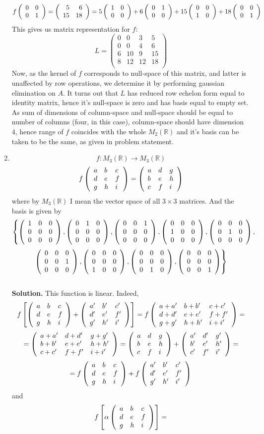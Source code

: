 \documentclass[12pt,fleqn]{article} %
\begin{document}
\begin{enumerate}
	\[f\left(\begin{array}{rr}0&0\\0&1\end{array}\right)=
\left(\begin{array}{rr}
5&6\\
15&18\\
\end{array}\right)=5\left(\begin{array}{rr}1&0\\0&0\end{array}\right)+6\left(\begin{array}{rr}0&1\\0&0\end{array}\right)+15\left(\begin{array}{rr}0&0\\1&0\end{array}\right)+18\left(\begin{array}{rr}0&0\\0&1\end{array}\right)\]
This gives us matrix representation for $f$:
\[L=\left(\begin{array}{rrrr}
	0&0&3&5\\
	0&0&4&6\\
	6&10&9&15\\
	8&12&12&18\\
\end{array}\right)\]
Now, as the kernel of $f$ corresponds to null-space of this matrix, and latter is unaffected by row operations, we determine it
by performing gaussian elimination on $A$. It turns out that $L$ has reduced row echelon form equal to identity matrix, hence
it's null-space is zero and has basis equal to empty set. As sum of dimensions of column-space and null-space should be equal
to number of columns (four, in this case), column-space should have dimension 4, hence range of $f$ coincides with the whole $M_2(
\mathbb{R})$ and it's basis can be taken to be the same, as given in problem statement.
\item \[f:M_3(\mathbb{R})\to M_3(\mathbb{R})\]%
	\[f\left(\begin{array}{lll}a&b&c\\d&e&f\\g&h&i\end{array}\right)=\left(\begin{array}{lll}a&d&g\\b&e&h\\c&f&i\end{array}\right)\]
	where by $M_3(\mathbb{R})$ I mean the vector space of all $3\times3$ matrices. And the basis is given by
	\[\left\{
	\left(\begin{array}{lll}1&0&0\\0&0&0\\0&0&0\end{array}\right),
	\left(\begin{array}{lll}0&1&0\\0&0&0\\0&0&0\end{array}\right),
	\left(\begin{array}{lll}0&0&1\\0&0&0\\0&0&0\end{array}\right),
	\left(\begin{array}{lll}0&0&0\\1&0&0\\0&0&0\end{array}\right),
	\left(\begin{array}{lll}0&0&0\\0&1&0\\0&0&0\end{array}\right),\right.\]\[\left.
	\left(\begin{array}{lll}0&0&0\\0&0&1\\0&0&0\end{array}\right),
	\left(\begin{array}{lll}0&0&0\\0&0&0\\1&0&0\end{array}\right),
	\left(\begin{array}{lll}0&0&0\\0&0&0\\0&1&0\end{array}\right),
	\left(\begin{array}{lll}0&0&0\\0&0&0\\0&0&1\end{array}\right)
	\right\}\]
	\\\textbf{Solution.} 
	This function is linear. Indeed, 
	\[f\left[\left(\begin{array}{lll}a&b&c\\d&e&f\\g&h&i\end{array}\right)+
	\left(\begin{array}{lll}a'&b'&c'\\d'&e'&f'\\g'&h'&i'\end{array}\right)\right]=f\left(\begin{array}{lll}a+a'&b+b'&c+c'\\d+d'&e+e'&f+f'\\g+g'&h+h'&i+i'\end{array}\right)=\]
	\[=\left(\begin{array}{lll}a+a'&d+d'&g+g'\\b+b'&e+e'&h+h'\\c+c'&f+f'&i+i'\end{array}\right)=
	\left(\begin{array}{lll}a&d&g\\b&e&h\\c&f&i\end{array}\right)+
	\left(\begin{array}{lll}a'&d'&g'\\b'&e'&h'\\c'&f'&i'\end{array}\right)=\]\[=f\left(\begin{array}{lll}a&b&c\\d&e&f\\g&h&i\end{array}\right)+
	f\left(\begin{array}{lll}a'&b'&c'\\d'&e'&f'\\g'&h'&i'\end{array}\right)\]
	and 
	\[f\left[\alpha\left(\begin{array}{lll}a&b&c\\d&e&f\\g&h&i\end{array}\right)\right]=
\]
\end{enumerate}
\end{document}
